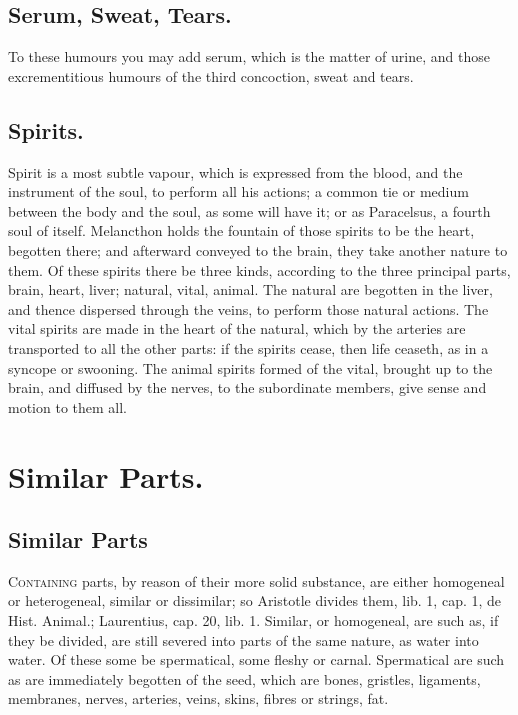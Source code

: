 {\subsection{Serum, Sweat, Tears.}
To these humours you may add serum, which is
the matter of urine, and those excrementitious humours of the third
concoction, sweat and tears.

\subsection{Spirits.}
Spirit is a most subtle vapour, which is expressed from the
blood, and the instrument of the soul, to perform all his actions; a
common tie or medium between the body and the soul, as some will have
it; or as Paracelsus, a fourth soul of itself. Melancthon holds
the fountain of those spirits to be the heart, begotten there; and
afterward conveyed to the brain, they take another nature to them. Of
these spirits there be three kinds, according to the three principal
parts, brain, heart, liver; natural, vital, animal. The natural are
begotten in the liver, and thence dispersed through the veins, to
perform those natural actions. The vital spirits are made in the heart
of the natural, which by the arteries are transported to all the other
parts: if the spirits cease, then life ceaseth, as in a syncope or
swooning. The animal spirits formed of the vital, brought up to the
brain, and diffused by the nerves, to the subordinate members, give
sense and motion to them all.

\section{Similar Parts.}

\subsection{Similar Parts}
\lettrine{C}{ontaining} parts, by reason of their more solid
substance, are either homogeneal or heterogeneal, similar or
dissimilar; so Aristotle divides them, lib. 1, cap. 1, de Hist.
Animal.; Laurentius, cap. 20, lib. 1. Similar, or homogeneal, are such
as, if they be divided, are still severed into parts of the same
nature, as water into water. Of these some be spermatical, some fleshy
or carnal. Spermatical are such as are immediately begotten of the
seed, which are bones, gristles, ligaments, membranes, nerves,
arteries, veins, skins, fibres or strings, fat.

}
